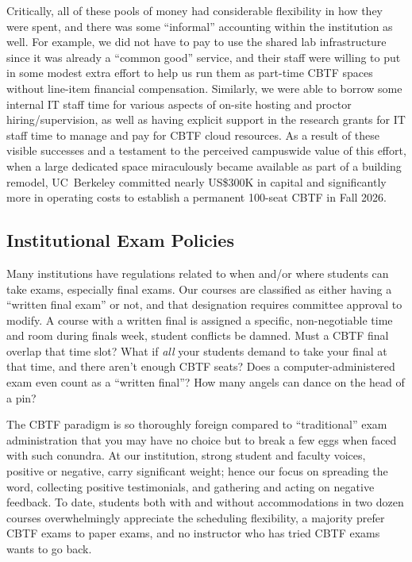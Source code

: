 Critically, all of these pools of money had considerable flexibility
in how they were spent, and there was some ``informal'' accounting
within the institution as well.  For example, we did not have to pay
to use the shared lab infrastructure since it was already a ``common
good'' service, and their staff were willing to put in some  modest
extra effort to help us run them as part-time CBTF spaces
without line-item financial compensation.
Similarly, we were able to borrow some internal IT staff time for various
aspects of on-site hosting and proctor hiring/supervision,
as well as having explicit support in the research grants for IT staff
time to manage and pay for
CBTF cloud resources.
As a result of these visible successes and a testament to the
perceived campuswide value of this effort, when a large dedicated space miraculously became available as part of
a building remodel, UC~Berkeley committed nearly US\$300K in capital
and significantly more in operating costs to establish a permanent 100-seat CBTF in
Fall 2026. 

\subsection{Institutional Exam Policies}


Many institutions have regulations related to when and/or where students can
take exams, especially final exams.
Our courses are classified as either having a
``written final exam'' or not, and that designation requires committee
approval to modify.
A course with a written final is assigned a specific, non-negotiable time and room
during finals week, student conflicts be damned.
Must a CBTF final overlap that time slot?
What if  \emph{all\/}  your students demand to take your final at that
time, and there aren't enough CBTF seats?
Does a computer-administered exam even count as a ``written final''?  How many
angels can dance on the head of a pin?

The CBTF paradigm is so thoroughly foreign
compared to ``traditional'' exam administration that you may have no
choice but to break a few eggs when faced with such conundra.
At our institution, strong student and faculty voices, positive or
negative, carry significant weight; hence our focus on
spreading the word, collecting positive testimonials, and
gathering and acting on negative feedback.
To date, students both with and without accommodations in two dozen
courses overwhelmingly
appreciate the scheduling flexibility, a majority  prefer CBTF exams
to paper exams, and no instructor who has tried CBTF exams
wants to go back. 

